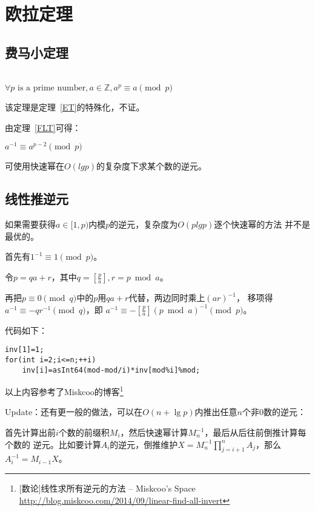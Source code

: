 \section{欧拉定理}
\subsection{费马小定理}\label{FLTS}
\begin{theorem}\label{FLT}
	~\\
	$\forall p \textrm{ is a prime number},a\in \mathbb{Z},a^p \equiv a \pmod{p}$
\end{theorem}

该定理是定理~\ref{ET}的特殊化，不证。

由定理~\ref{FLT}可得：

\begin{inference}
	$a^{-1} \equiv a^{p-2} \pmod{p}$
\end{inference}

可使用快速幂在$O(lgp)$的复杂度下求某个数的逆元。

\subsection{线性推逆元}

如果需要获得$a\in [1,p)$内模$p$的逆元，复杂度为$O(plgp)$逐个快速幂的方法
并不是最优的。

首先有$1^{-1}\equiv 1 \pmod{p}$。

令$p=qa+r$，其中$q=[\frac{p}{a}],r=p \bmod a$。

再把$p \equiv 0 \pmod{q}$中的$p$用$qa+r$代替，两边同时乘上$(ar)^{-1}$，
移项得$a^{-1}\equiv -qr^{-1} \pmod{q}$，即
$a^{-1}\equiv -[\frac{p}{a}](p \bmod a)^{-1} \pmod{p}$。

代码如下：
\begin{lstlisting}[title=inv]
inv[1]=1;
for(int i=2;i<=n;++i)
    inv[i]=asInt64(mod-mod/i)*inv[mod%i]%mod;
\end{lstlisting}

以上内容参考了Miskcoo的博客\footnote{[数论]线性求所有逆元的方法 – Miskcoo's Space\\
	\url{http://blog.miskcoo.com/2014/09/linear-find-all-invert}}

Update：还有更一般的做法，可以在$O(n+\lg p)$内推出任意$n$个非0数的逆元：

首先计算出前$i$个数的前缀积$M_i$，然后快速幂计算$M_n^{-1}$，最后从后往前倒推计算每个数的
逆元。比如要计算$A_i$的逆元，倒推维护$X=M_n^{-1}\prod_{j=i+1}^n{A_j}$，那么
$A_i^{-1}=M_{i-1}X$。


